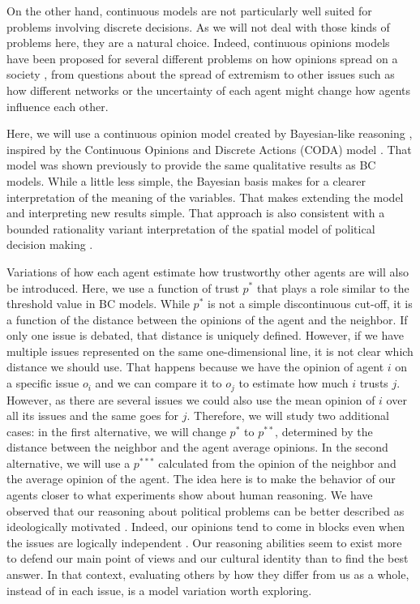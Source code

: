 \documentclass{article}
\begin{document}
On the other hand, continuous models are not particularly well suited for
problems involving discrete decisions. As we will not deal with those kinds of
problems here, they are a natural choice. Indeed, continuous opinions models
have been proposed for several different problems on how opinions spread on a
society \cite{deffuantetal02a,weisbuchetal05}, from questions about the spread
of extremism
\cite{amblarddeffuant04,gargiulomazzoni08a,franksetal08a,alizadeh14a,Albi2016,Mai2017}
to other issues such as how different networks
\cite{Kurmyshev2011,Acemoglu2011,Das2014,Hu2017} or the uncertainty of each
agent \cite{deffuant06} might change how agents influence each other.

Here, we will use a continuous opinion model created by Bayesian-like reasoning
\cite{martins08c}, inspired by the Continuous Opinions and Discrete Actions
(CODA) model \cite{martins08a,martins12b}. That model was shown previously
\cite{martins08c} to provide the same qualitative results as BC models. While a
little less simple, the Bayesian basis makes for a clearer interpretation of the
meaning of the variables. That makes extending the model and interpreting new
results simple. That approach is also consistent with a bounded rationality
variant interpretation of the spatial model of political decision making
\cite{humphreys2010spatial,ostrom1998behavioral}.

Variations of how each agent estimate how trustworthy other agents are will also
be introduced. Here, we use a function of trust $p^*$ that plays a role similar
to the threshold value in BC models. While $p^*$ is not a simple discontinuous
cut-off, it is a function of the distance between the opinions of the agent and
the neighbor. If only one issue is debated, that distance is uniquely defined.
However, if we have multiple issues represented on the same one-dimensional
line, it is not clear which distance we should use. That happens because we have
the opinion of agent $i$ on a specific issue $o_i$ and we can compare it to
$o_j$ to estimate how much $i$ trusts $j$. However, as there are several issues
we could also use the mean opinion of $i$ over all its issues and the same goes
for $j$. Therefore, we will study two additional cases: in the first
alternative, we will change \(p^*\) to \(p^{**}\), determined by the distance
between the neighbor and the agent average opinions. In the second alternative,
we will use a \(p^{***}\) calculated from the opinion of the neighbor and the
average opinion of the agent. The idea here is to make the behavior of our
agents closer to what experiments show about human reasoning. We have observed
that our reasoning about political problems can be better described as
ideologically motivated \cite{jostetal03a,taberlodge06a,Claassen2015a}. Indeed,
our opinions tend to come in blocks even when the issues are logically
independent \cite{jervis76a}. Our reasoning abilities seem to exist more to
defend our main point of views \cite{mercier11a,merciersperber11a} and our
cultural identity \cite{kahanetal11} than to find the best answer. In that
context, evaluating others by how they differ from us as a whole, instead of in
each issue, is a model variation worth exploring.
\end{document}
